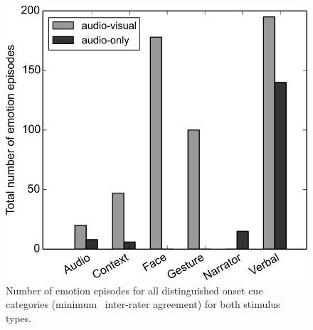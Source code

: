 \begin{figure}
  \centering
  \includegraphics[width=\linewidth]{figures/labeledoncue_episodes}
  \caption{Number of emotion episodes for all distinguished onset cue categories
    (minimum \AVAggThresh\ inter-rater agreement) for both stimulus types.}
  \label{fig:threshlabeledoncue}
\end{figure}
